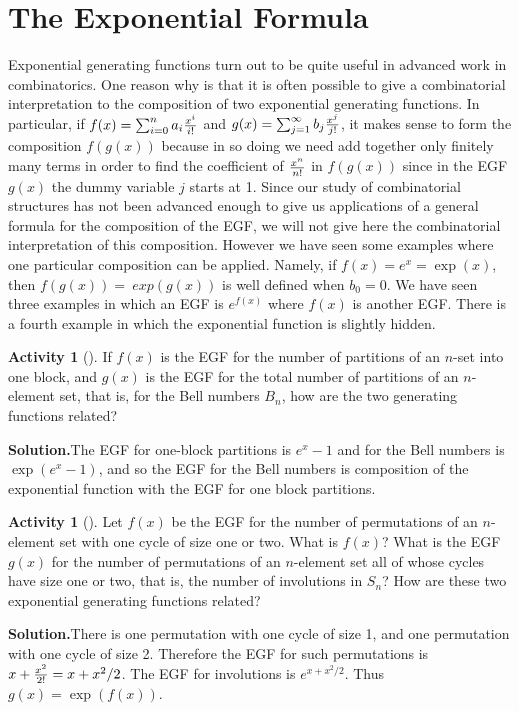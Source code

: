 \documentclass[10pt,]{book}
\theoremstyle{plain}
\theoremstyle{definition}
\newtheorem{activity}[project]{Activity}
\numberwithin{equation}{chapter}
\begin{document}
\section[{The Exponential Formula}]{The Exponential Formula}\label{section-10}
Exponential generating functions turn out to be quite useful in advanced work in combinatorics. One reason why is that it is often possible to give a combinatorial interpretation to the composition of two exponential generating functions. In particular, if \(f(x) =
\sum_{i=0}^n a_i{x^i\over i!}\) and \(g(x) = \sum_{j=1}^\infty b_j {x^j\over j!}\), it makes sense to form the composition \(f(g(x))\) because in so doing we need add together only finitely many terms in order to find the coefficient of \(x^n\over n!\) in \(f(g(x))\) since in the EGF \(g(x)\) the dummy variable \(j\) starts at 1. Since our study of combinatorial structures has not been advanced enough to give us applications of a general formula for the composition of the EGF, we will not give here the combinatorial interpretation of this composition. However we have seen some examples where one particular composition can be applied. Namely, if \(f(x) = e^x = \exp(x)\), then \(f(g(x)) =\ exp(g(x))\) is well defined when \(b_0=0\). We have seen three examples in which an EGF is \(e^{f(x)}\) where \(f(x)\) is another EGF. There is a fourth example in which the exponential function is slightly hidden.%
\begin{activity}[]\label{exp_oneblock_}
If \(f(x)\) is the EGF for the number of partitions of an \(n\)-set into one block, and \(g(x)\) is the EGF for the total number of partitions of an \(n\)-element set, that is, for the Bell numbers \(B_n\), how are the two generating functions related?%
\par\medskip\noindent%
\textbf{Solution.}\quad The EGF for one-block partitions is \(e^x-1\) and for the Bell numbers is \(\exp(e^x-1)\), and so the EGF for the Bell numbers is composition of the exponential function with the EGF for one block partitions.%
\end{activity}
\begin{activity}[]\label{exp_oneortwo-cycle_}
Let \(f(x)\) be the EGF for the number of permutations of an \(n\)-element set with one cycle of size one or two. What is \(f(x)\)? What is the EGF \(g(x)\) for the number of permutations of an \(n\)-element set all of whose cycles have size one or two, that is, the number of involutions in \(S_n\)? How are these two exponential generating functions related?%
\par\medskip\noindent%
\textbf{Solution.}\quad There is one permutation with one cycle of size 1, and one permutation with one cycle of size 2. Therefore the EGF for such permutations is \(x+{x^2\over 2!}= x+x^2/2\). The EGF for involutions is \(e^{x+x^2/2}\). Thus \(g(x) = \exp(f(x))\).%
\end{activity}
\end{document}
